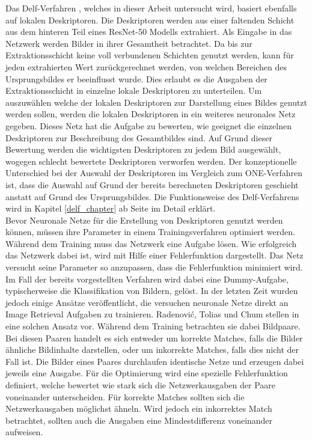 Das Delf-Verfahren \cite{delf}, welches in dieser Arbeit untersucht wird, basiert ebenfalls auf lokalen Deskriptoren. Die Deskriptoren werden aus einer faltenden Schicht aus dem hinteren Teil eines ResNet-50 \cite{resnet} Modells extrahiert. Als Eingabe in das Netzwerk werden Bilder in ihrer Gesamtheit betrachtet. Da bis zur Extraktionsschicht keine voll verbundenen Schichten genutzt werden, kann für jeden extrahierten Wert zurückgerechnet werden, von welchen Bereichen des Ursprungsbildes er beeinflusst wurde. Dies erlaubt es die Ausgaben der Extraktionsschicht in einzelne lokale Deskriptoren zu unterteilen. Um auszuwählen welche der lokalen Deskriptoren zur Darstellung eines Bildes genutzt werden sollen, werden die lokalen Deskriptoren in ein weiteres neuronales Netz gegeben. Dieses Netz hat die Aufgabe zu bewerten, wie geeignet die einzelnen Deskriptoren zur Beschreibung des Gesamtbildes sind. Auf Grund dieser Bewertung werden die wichtigsten Deskriptoren zu jedem Bild ausgewählt, wogegen schlecht bewertete Deskriptoren verworfen werden. Der konzeptionelle Unterschied bei der Auswahl der Deskriptoren im Vergleich zum ONE-Verfahren ist, dass die Auswahl auf Grund der bereits berechneten Deskriptoren geschieht anstatt auf Grund des Ursprungsbildes. Die Funktionsweise des Delf-Verfahrens wird in Kapitel \ref{delf_chapter} ab Seite \pageref{delf_chapter} im Detail erklärt.
\\  
Bevor Neuronale Netze für die Erstellung von Deskriptoren genutzt werden können, müssen ihre Parameter in einem Trainingsverfahren optimiert werden. Während dem Training muss das Netzwerk eine Aufgabe lösen. Wie erfolgreich das Netzwerk dabei ist, wird mit Hilfe einer Fehlerfunktion dargestellt. Das Netz versucht seine Parameter so anzupassen, dass die Fehlerfunktion minimiert wird. Im Fall der bereits vorgestellten Verfahren wird dabei eine Dummy-Aufgabe, typischerweise die Klassifikation von Bildern, gelöst. In der letzten Zeit wurden jedoch einige Ansätze veröffentlicht, die versuchen neuronale Netze direkt an Image Retrieval Aufgaben zu trainieren. Radenović, Tolias und Chum stellen in \cite{siamac_contrastive_loss} eine solchen Ansatz vor. Während dem Training betrachten sie dabei Bildpaare. Bei diesen Paaren handelt es sich entweder um korrekte Matches, falls die Bilder ähnliche Bildinhalte darstellen, oder um inkorrekte Matches, falls dies nicht der Fall ist. Die Bilder eines Paares durchlaufen identische Netze und erzeugen dabei jeweils eine Ausgabe. Für die Optimierung wird eine spezielle Fehlerfunktion definiert, welche bewertet wie stark sich die Netzwerkausgaben der Paare voneinander unterscheiden. Für korrekte Matches sollten sich die Netzwerkausgaben möglichst ähneln. Wird jedoch ein inkorrektes Match betrachtet, sollten auch die Ausgaben eine Mindestdifferenz voneinander aufweisen.
